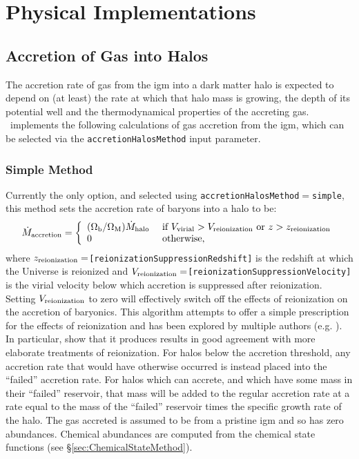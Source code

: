 \chapter{Physical Implementations}

\section{Accretion of Gas into Halos}\label{sec:AccretionBaryonic}

The accretion rate of gas from the \gls{igm} into a dark matter halo is expected to depend on (at least) the rate at which that halo mass is growing, the depth of its potential well and the thermodynamical properties of the accreting gas. \glc\ implements the following calculations of gas accretion from the \gls{igm}, which can be selected via the {\tt accretionHalosMethod} input parameter.

\subsection{Simple Method}

Currently the only option, and selected using {\tt accretionHalosMethod}$=${\tt simple}, this method sets the accretion rate of baryons into a halo to be:
\begin{equation}
 \dot{M}_{\rm accretion} = \left\{ \begin{array}{ll} (\Omega_{\rm b}/\Omega_{\rm M}) \dot{M}_{\rm halo} & \hbox{ if } V_{\rm virial} > V_{\rm reionization} \hbox{ or } z > z_{\rm reionization} \\ 0 & \hbox{ otherwise,}\end{array} \right.
\end{equation}
where $z_{\rm reionization}=${\tt [reionizationSuppressionRedshift]} is the redshift at which the Universe is reionized and $V_{\rm reionization}=${\tt [reionizationSuppressionVelocity]} is the virial velocity below which accretion is suppressed after reionization. Setting $V_{\rm reionization}$ to zero will effectively switch off the effects of reionization on the accretion of baryonics. This algorithm attempts to offer a simple prescription for the effects of reionization and has been explored by multiple authors (e.g. \citealt{benson_effects_2002}). In particular, \cite{font_modelingmilky_2010} show that it produces results in good agreement with more elaborate treatments of reionization. For halos below the accretion threshold, any accretion rate that would have otherwise occurred is instead placed into the ``failed'' accretion rate. For halos which can accrete, and which have some mass in their ``failed'' reservoir, that mass will be added to the regular accretion rate at a rate equal to the mass of the ``failed'' reservoir times the specific growth rate of the halo. The gas accreted is assumed to be from a pristine \gls{igm} and so has zero abundances. Chemical abundances are computed from the chemical state functions (see \S\ref{sec:ChemicalStateMethod}).

